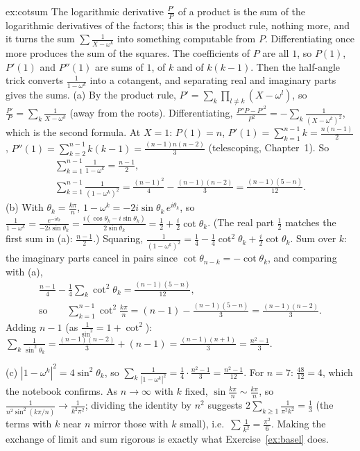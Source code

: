 \begin{solution}{ex:cotsum}
\idea The logarithmic derivative $\frac{P'}P$ of a product is the sum of the logarithmic derivatives of the factors; this is the product rule, nothing more, and it turns the sum $\sum\frac1{X-\omega^k}$ into something computable from $P$. Differentiating once more produces the sum of the squares. The coefficients of $P$ are all $1$, so $P(1)$, $P'(1)$ and $P''(1)$ are sums of $1$, of $k$ and of $k(k-1)$. Then the half-angle trick converts $\frac1{1-\omega^k}$ into a cotangent, and separating real and imaginary parts gives the sums.
\writeup (a) By the product rule, $P'=\sum_k\prod_{l\ne k}(X-\omega^l)$, so $\frac{P'}P=\sum_k\frac1{X-\omega^k}$ (away from the roots). Differentiating, $\frac{P''P-P'^2}{P^2}=-\sum_k\frac1{(X-\omega^k)^2}$, which is the second formula. At $X=1$: $P(1)=n$, $P'(1)=\sum_{k=1}^{n-1}k=\frac{n(n-1)}2$, $P''(1)=\sum_{k=2}^{n-1}k(k-1)=\frac{(n-1)n(n-2)}3$ (telescoping, Chapter~1). So
\[
\begin{gathered}\sum_{k=1}^{n-1}\frac1{1-\omega^k}=\frac{n-1}2,\\ \sum_{k=1}^{n-1}\frac1{(1-\omega^k)^2}=\frac{(n-1)^2}4-\frac{(n-1)(n-2)}3=\frac{(n-1)(5-n)}{12}.\end{gathered}
\]
(b) With $\theta_k=\frac{k\pi}n$, $1-\omega^k=-2i\sin\theta_k\,e^{i\theta_k}$, so $\frac1{1-\omega^k}=\frac{e^{-i\theta_k}}{-2i\sin\theta_k}=\frac{i(\cos\theta_k-i\sin\theta_k)}{2\sin\theta_k}=\frac12+\frac i2\cot\theta_k$. (The real part $\frac12$ matches the first sum in (a): $\frac{n-1}2$.) Squaring, $\frac1{(1-\omega^k)^2}=\frac14-\frac14\cot^2\theta_k+\frac i2\cot\theta_k$. Sum over $k$: the imaginary parts cancel in pairs since $\cot\theta_{n-k}=-\cot\theta_k$, and comparing with (a),
\[
\begin{gathered}\frac{n-1}4-\frac14\sum_k\cot^2\theta_k=\frac{(n-1)(5-n)}{12},\\ \text{so}\qquad\sum_{k=1}^{n-1}\cot^2\frac{k\pi}n=(n-1)-\frac{(n-1)(5-n)}3=\frac{(n-1)(n-2)}3.\end{gathered}
\]
Adding $n-1$ (as $\frac1{\sin^2}=1+\cot^2$): $\sum_k\frac1{\sin^2\theta_k}=\frac{(n-1)(n-2)}3+(n-1)=\frac{(n-1)(n+1)}3=\frac{n^2-1}3$.

(c) $|1-\omega^k|^2=4\sin^2\theta_k$, so $\sum_k\frac1{|1-\omega^k|^2}=\frac14\cdot\frac{n^2-1}3=\frac{n^2-1}{12}$. For $n=7$: $\frac{48}{12}=4$, which the notebook confirms. As $n\to\infty$ with $k$ fixed, $\sin\frac{k\pi}n\sim\frac{k\pi}n$, so $\frac1{n^2\sin^2(k\pi/n)}\to\frac1{k^2\pi^2}$; dividing the identity by $n^2$ suggests $2\sum_{k\ge1}\frac1{\pi^2k^2}=\frac13$ (the terms with $k$ near $n$ mirror those with $k$ small), i.e.\ $\sum\frac1{k^2}=\frac{\pi^2}6$. Making the exchange of limit and sum rigorous is exactly what Exercise~\ref{ex:basel} does.
\end{solution}

